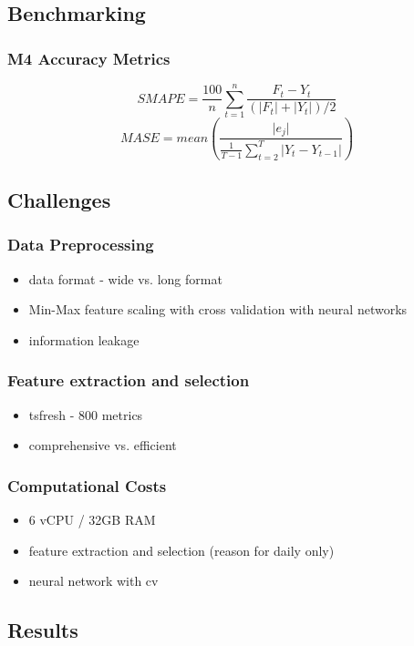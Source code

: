 \documentclass[11pt]{article}
\begin{document}
\subsection*{Benchmarking}
\label{sec:orge7b84ed}
\subsubsection*{M4 Accuracy Metrics}
\label{sec:org3921d7d}
$$ SMAPE = \frac{100}{n} \sum_{t=1}^{n} \frac{F_t - Y_t}{(\lvert F_t \rvert + \lvert Y_t \rvert)/2} $$
$$ MASE = mean \left( \frac{\lvert e_j \rvert}{\frac{1}{T-1} \sum_{t=2}^{T} \lvert Y_t - Y_{t-1} \rvert} \right) $$
\subsection*{Challenges}
\label{sec:org1df2eed}
\subsubsection*{Data Preprocessing}
\label{sec:orga9d24d7}
\begin{itemize}
\item data format - wide vs. long format
\item Min-Max feature scaling with cross validation with neural networks
\item information leakage
\end{itemize}
\subsubsection*{Feature extraction and selection}
\label{sec:org43a3fd8}
\begin{itemize}
\item tsfresh - 800 metrics
\item comprehensive vs. efficient
\end{itemize}
\subsubsection*{Computational Costs}
\label{sec:orgdd853d7}
\begin{itemize}
\item 6 vCPU / 32GB RAM
\item feature extraction and selection (reason for daily only)
\item neural network with cv
\end{itemize}

\subsection*{Results}
\label{sec:orgc1a5651}
\end{document}
